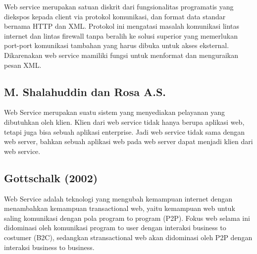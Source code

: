 \documentclass[12pt]{journal}
\begin{document}
Web service merupakan satuan diskrit dari fungsionalitas programatis yang diekspos 
kepada client via protokol komunikasi, dan format data standar bernama HTTP dan 
XML. Protokol ini mengatasi masalah komunikasi lintas internet dan lintas 
firewall tanpa beralih ke solusi superior yang memerlukan port-port komunikasi 
tambahan yang harus dibuka untuk akses eksternal. Dikarenakan web service mamiliki fungsi untuk menformat dan menguraikan pesan XML\cite{sarbini2015pengembangan}. 

\subsection{M. Shalahuddin dan Rosa A.S.}

Web Service merupakan suatu sistem yang menyediakan pelayanan yang dibutuhkan oleh klien. Klien dari web service tidak hanya berupa aplikasi web, tetapi juga bisa sebuah aplikasi enterprise. Jadi web service tidak sama dengan web server, bahkan sebuah aplikasi web pada web server dapat menjadi klien dari web service\cite{inayah2014aplikasi}.

\subsection{Gottschalk (2002)}

Web Service adalah teknologi yang mengubah kemampuan internet dengan menambahkan kemampuan transactional web, yaitu kemampuan web untuk saling komunikasi dengan pola program to program (P2P). Fokus web selama ini didominasi oleh komunikasi program to user dengan interaksi business to costumer (B2C), sedangkan stransactional web akan didominasi oleh P2P dengan interaksi business to business\cite{fauziah2014aplikasi}.
\end{document}
